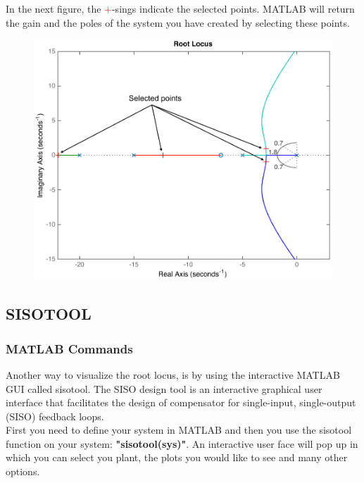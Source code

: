 \begin{frame}
	\begin{exampleblock}{}
		In the next figure, the \textcolor{red}{$+$}-sings indicate the selected points. MATLAB will return the gain and the poles of the system you have created by selecting these points.
		\vspace{-0.5em}
		\begin{figure}
			\centering
			\includegraphics[width=0.6\linewidth]{matlab_ex3}
		\end{figure}
	\end{exampleblock}
\end{frame}

\subsection{SISOTOOL}

\begin{frame}
\frametitle{MATLAB Commands}
	Another way to visualize the root locus, is by using the interactive MATLAB GUI called sisotool. The SISO design tool is an interactive graphical user interface that facilitates the design of compensator for single-input, single-output (SISO) feedback loops.\\
	\vspace{1em}
	First you need to define your system in MATLAB and then you use the sisotool function on your system: \textbf{"sisotool(sys)"}. An interactive user face will pop up in which you can select you plant, the plots you would like to see and many other options.	
\end{frame}

